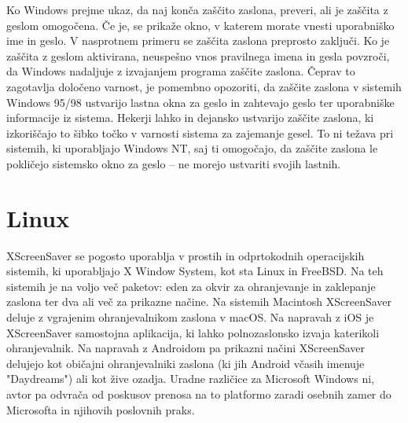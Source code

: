 \documentclass[11pt, oneside]{article}   	%
\begin{document}
Ko Windows prejme ukaz, da naj konča zaščito zaslona, preveri, ali je zaščita z geslom omogočena. Če je, se prikaže okno, v katerem morate vnesti uporabniško ime in geslo. V nasprotnem primeru se zaščita zaslona preprosto zaključi. Ko je zaščita z geslom aktivirana, neuspešno vnos pravilnega imena in gesla povzroči, da Windows nadaljuje z izvajanjem programa zaščite zaslona. Čeprav to zagotavlja določeno varnost, je pomembno opozoriti, da zaščite zaslona v sistemih Windows 95/98 ustvarijo lastna okna za geslo in zahtevajo geslo ter uporabniške informacije iz sistema. Hekerji lahko in dejansko ustvarijo zaščite zaslona, ki izkoriščajo to šibko točko v varnosti sistema za zajemanje gesel. To ni težava pri sistemih, ki uporabljajo Windows NT, saj ti omogočajo, da zaščite zaslona le pokličejo sistemsko okno za geslo – ne morejo ustvariti svojih lastnih.


\section{Linux}
XScreenSaver se pogosto uporablja v prostih in odprtokodnih operacijskih sistemih, ki uporabljajo X Window System, kot sta Linux in FreeBSD. Na teh sistemih je na voljo več paketov: eden za okvir za ohranjevanje in zaklepanje zaslona ter dva ali več za prikazne načine.
\newline
Na sistemih Macintosh XScreenSaver deluje z vgrajenim ohranjevalnikom zaslona v macOS. Na napravah z iOS je XScreenSaver samostojna aplikacija, ki lahko polnozaslonsko izvaja katerikoli ohranjevalnik. Na napravah z Androidom pa prikazni načini XScreenSaver delujejo kot običajni ohranjevalniki zaslona (ki jih Android včasih imenuje "Daydreams") ali kot žive ozadja.
\newline
Uradne različice za Microsoft Windows ni, avtor pa odvrača od poskusov prenosa na to platformo zaradi osebnih zamer do Microsofta in njihovih poslovnih praks.
\end{document}

